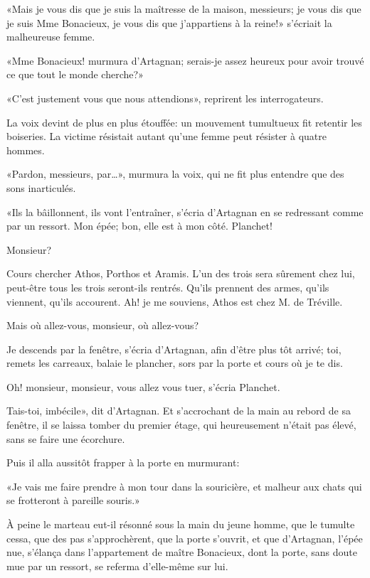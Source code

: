 «Mais je vous dis que je suis la maîtresse de la maison, messieurs; je vous dis que je suis Mme Bonacieux, je vous dis que j'appartiens à la reine!» s'écriait la malheureuse femme. 

«Mme Bonacieux! murmura d'Artagnan; serais-je assez heureux pour avoir trouvé ce que tout le monde cherche?» 

«C'est justement vous que nous attendions», reprirent les interrogateurs. 

La voix devint de plus en plus étouffée: un mouvement tumultueux fit retentir les boiseries. La victime résistait autant qu'une femme peut résister à quatre hommes. 

«Pardon, messieurs, par\dots», murmura la voix, qui ne fit plus entendre que des sons inarticulés. 

«Ils la bâillonnent, ils vont l'entraîner, s'écria d'Artagnan en se redressant comme par un ressort. Mon épée; bon, elle est à mon côté. Planchet! 

\speak  Monsieur? 

\speak  Cours chercher Athos, Porthos et Aramis. L'un des trois sera sûrement chez lui, peut-être tous les trois seront-ils rentrés. Qu'ils prennent des armes, qu'ils viennent, qu'ils accourent. Ah! je me souviens, Athos est chez M. de Tréville. 

\speak  Mais où allez-vous, monsieur, où allez-vous? 

\speak  Je descends par la fenêtre, s'écria d'Artagnan, afin d'être plus tôt arrivé; toi, remets les carreaux, balaie le plancher, sors par la porte et cours où je te dis. 

\speak  Oh! monsieur, monsieur, vous allez vous tuer, s'écria Planchet. 

\speak  Tais-toi, imbécile», dit d'Artagnan. Et s'accrochant de la main au rebord de sa fenêtre, il se laissa tomber du premier étage, qui heureusement n'était pas élevé, sans se faire une écorchure. 

Puis il alla aussitôt frapper à la porte en murmurant: 

«Je vais me faire prendre à mon tour dans la souricière, et malheur aux chats qui se frotteront à pareille souris.» 

À peine le marteau eut-il résonné sous la main du jeune homme, que le tumulte cessa, que des pas s'approchèrent, que la porte s'ouvrit, et que d'Artagnan, l'épée nue, s'élança dans l'appartement de maître Bonacieux, dont la porte, sans doute mue par un ressort, se referma d'elle-même sur lui. 

